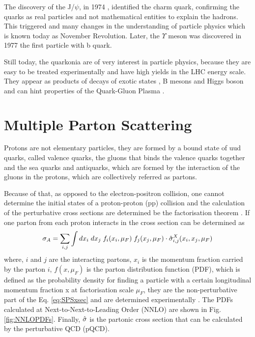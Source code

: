 The discovery of the J/$\psi$, in 1974 \cite{E598:1974sol, SLAC-SP-017:1974ind}, identified the charm quark, confirming the quarks as real particles and not mathematical entities to explain the hadrons. This triggered and many changes in the understanding of particle physics which is known today as November Revolution. Later, the $\Upsilon$ meson was discovered in 1977 \cite{E288:1977xhf} the first particle with b quark.

Still today, the quarkonia are of very interest in particle physics, because they are easy to be treated experimentally and have high yields in the LHC energy scale. They appear as products of decays of exotic states \cite{CMS:2013jru, LHCb:2021uow, LHCb:2021vvq}, B mesons and Higgs boson \cite{ATLAS:2015vss} and can hint properties of the Quark-Gluon Plasma \cite{Matsui:1986dk, Wolschin:2016oua}.

\section{Multiple Parton Scattering}

Protons are not elementary particles, they are formed by a bound state of uud quarks, called valence quarks, the gluons that binds the valence quarks together and the sea quarks and antiquarks, which are formed by the interaction of the gluons in the protons, which are collectively referred as partons.

Because of that, as opposed to the electron-positron collision, one cannot determine the initial states of a proton-proton (pp) collision and the calculation of the perturbative cross sections are determined be the factorisation theorem \cite{Collins:1989gx}. If one parton from each proton interacts in the cross section can be determined as
\begin{equation}\label{eq:SPSxsec}
    \sigma_{A} = \sum_{i,j}\int dx_i \; dx_j \; f_i(x_i, \mu_F) \; f_j(x_j, \mu_F) \cdot \Hat{\sigma}_{i,j}^X(x_i, x_j, \mu_F)  
\end{equation}
where, $i$ and $j$ are the interacting partons, $x_i$ is the momentum fraction carried by the parton $i$, $f(x, \mu_F)$ is the parton distribution function (PDF), which is defined as the probability density for finding a particle with a certain longitudinal momentum fraction x at factorisation scale $\mu_F$, they are the non-perturbative part of the Eq. \ref{eq:SPSxsec} and are determined experimentally \cite{NNPDF:2017mvq}. The PDFs calculated at Next-to-Next-to-Leading Order (NNLO) are shown in Fig. \ref{fig:NNLOPDFs}. Finally, $\Hat{\sigma}$ is the partonic cross section that can be calculated by the perturbative QCD (pQCD). 

